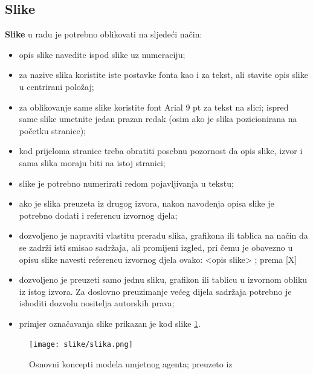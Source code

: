 \documentclass[]{foi}
\begin{document}
\subsection{Slike}

\textbf{Slike} u radu je potrebno oblikovati na sljedeći način:

\begin{itemize}
	\item opis slike navedite ispod slike uz numeraciju;

	\item za nazive slika koristite iste postavke fonta kao i za tekst, ali stavite opis slike u centrirani položaj;

	\item za oblikovanje same slike koristite font Arial 9 pt za tekst na slici;
	      ispred same slike umetnite jedan prazan redak (osim ako je slika pozicionirana na početku stranice);

	\item kod prijeloma stranice treba obratiti posebnu pozornost da opis slike, izvor i sama slika moraju biti na istoj stranici;

	\item slike je potrebno numerirati redom pojavljivanja u tekstu;

	\item ako je slika preuzeta iz drugog izvora, nakon navođenja opisa slike je potrebno dodati i referencu izvornog djela;

	\item dozvoljeno je napraviti vlastitu preradu slika, grafikona ili tablica na način da se zadrži isti smisao sadržaja, ali promijeni izgled, pri čemu je obavezno u opisu slike navesti referencu izvornog djela ovako: <opis slike> ; prema [X]

	\item dozvoljeno je preuzeti samo jednu sliku, grafikon ili tablicu u izvornom obliku iz istog izvora. Za doslovno preuzimanje većeg dijela sadržaja potrebno je ishoditi dozvolu nositelja autorskih prava;

	\item primjer označavanja slike prikazan je kod slike \ref{fig:podjela}.
\end{itemize}

\begin{figure}[]
	\centering
	\texttt{[image: slike/slika.png]}
	\caption{Osnovni koncepti modela umjetnog agenta; preuzeto iz \cite{russell2022ArtificialIntelligenceModern}}
	\label{fig:podjela}
\end{figure}
\end{document}

